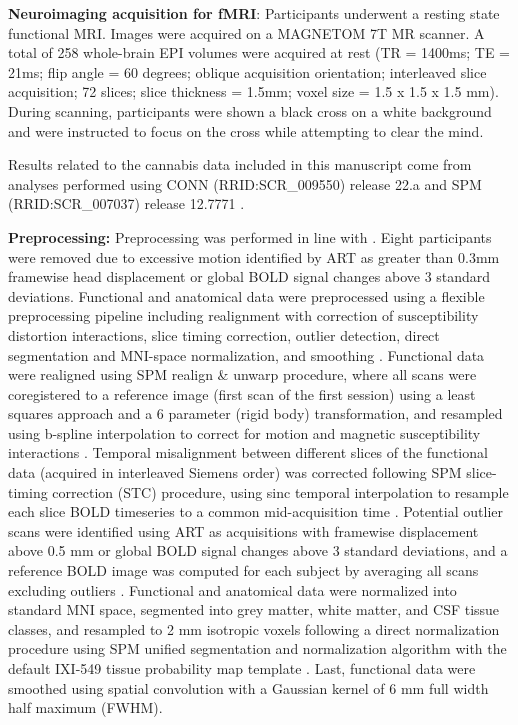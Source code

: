 \textbf{Neuroimaging acquisition for fMRI}: Participants underwent a
resting state functional MRI. Images were acquired on a MAGNETOM 7T MR
scanner. A total of 258 whole-brain EPI volumes were acquired at rest
(TR = 1400ms; TE = 21ms; flip angle = 60 degrees; oblique acquisition
orientation; interleaved slice acquisition; 72 slices; slice thickness =
1.5mm; voxel size = 1.5 x 1.5 x 1.5 mm). During scanning, participants
were shown a black cross on a white background and were instructed to
focus on the cross while attempting to clear the mind.

Results related to the cannabis data included in this manuscript come
from analyses performed using CONN (RRID:SCR\_009550) release 22.a and
SPM (RRID:SCR\_007037) release 12.7771 \parencite{Nieto-Castanon2022,Penny2007,Whitfield-Gabrieli2012}.

\textbf{Preprocessing:} Preprocessing was performed in line with \textcite{Luppi2021}. Eight participants were removed due to excessive motion identified by ART as greater than 0.3mm framewise head displacement or global BOLD signal changes above 3 standard deviations. Functional and anatomical data were
preprocessed using a flexible preprocessing pipeline including
realignment with correction of susceptibility distortion interactions,
slice timing correction, outlier detection, direct segmentation and
MNI-space normalization, and smoothing \parencite{Nieto-Castanon2020}.
Functional data were realigned using SPM realign \& unwarp procedure,
where all scans were coregistered to a reference image (first scan of
the first session) using a least squares approach and a 6 parameter
(rigid body) transformation, and resampled using b-spline interpolation
to correct for motion and magnetic susceptibility interactions \parencite{Andersson2001,Friston1995}. Temporal
misalignment between different slices of the functional data (acquired
in interleaved Siemens order) was corrected following SPM slice-timing
correction (STC) procedure, using sinc temporal interpolation to
resample each slice BOLD timeseries to a common mid-acquisition time \parencite{Henson1999,Sladky2011}. Potential outlier scans were
identified using ART as acquisitions with framewise displacement above
0.5 mm or global BOLD signal changes above 3 standard deviations, and a
reference BOLD image was computed for each subject by averaging all
scans excluding outliers \parencite{Nieto-Castanon2022a,Power2014,Whitfield-Gabrieli2011}. Functional and
anatomical data were normalized into standard MNI space, segmented into
grey matter, white matter, and CSF tissue classes, and resampled to 2 mm
isotropic voxels following a direct normalization procedure using SPM
unified segmentation and normalization algorithm with the default
IXI-549 tissue probability map template \parencite{Ashburner2007,Ashburner2005,Calhoun2017,Nieto-Castanon2022a}. Last, functional data were smoothed using
spatial convolution with a Gaussian kernel of 6 mm full width half
maximum (FWHM).

